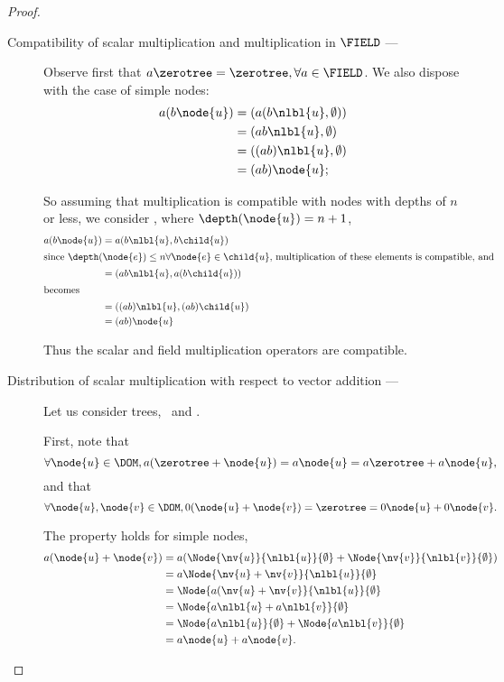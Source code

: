 \begin{proposition}
\begin{proof}
\begin{description}
    \item[Compatibility of scalar multiplication and multiplication in
      $\FIELD$ --- ]

      Observe first that $a \zerotree = \zerotree, \forall a \in
      \FIELD$. We also dispose with the case of simple nodes:
      \begin{align*}
        a(b \node{u}) &= (a(b \nlbl{u}, \emptyset)) \\
        &= (a b \nlbl{u}, \emptyset) \\
        &= ((a b) \nlbl{u}, \emptyset) \\
        &= (a b) \node{u};
      \end{align*}

      So assuming that multiplication is compatible with nodes with
      depths of $n$ or less, we consider , where $\depth(\node{u})
      = n+1$,
      \begin{align*}
        a (b \node{u}) &= a (b  \nlbl{u}, b\child{u}) \\
        \intertext{since $\depth(\node{e}) \leq n \forall \node{e}\in \child{u},$ multiplication of these elements is compatible, and }
        &= (a b\/ \nlbl{u}, a(b\child{u})) \\
        \intertext{becomes}
        &= ((a b) \nlbl{u}, (a b)\child{u}) \\
        &= (a b) \node{u}
      \end{align*}

      Thus the scalar and field multiplication operators are compatible.

    \item[Distribution of scalar multiplication with respect to vector addition --- ]

      Let us consider trees, \ and .

      First, note that \[\forall \node{u} \in \DOM, a(\zerotree + \node{u}) = a \node{u} = a\zerotree + a \node{u},\]
      and that \[\forall \node{u},\node{v}\in\DOM, 0 (\node{u} + \node{v}) = \zerotree = 0 \node{u} + 0 \node{v}.\]

      The property holds for simple nodes, 
      \begin{align*}
        a(\node{u} + \node{v}) &= a (\Node{\nv{u}}{\nlbl{u}}{\emptyset} + \Node{\nv{v}}{\nlbl{v}}{\emptyset})\\ 
        &= a \Node{\nv{u} +  {\nv{v}}}{\nlbl{u}}{\emptyset} \\
        &= \Node{a(\nv{u}+\nv{v}}{\nlbl{u}}{\emptyset} \\
        &= \Node{a\nlbl{u} + a\nlbl{v}}{\emptyset} \\
        &= \Node{a\nlbl{u}}{\emptyset} + \Node{a\nlbl{v}}{\emptyset} \\
        &= a \node{u} + a \node{v}.
      \end{align*}


\end{description}
\end{proof}
\end{proposition}
